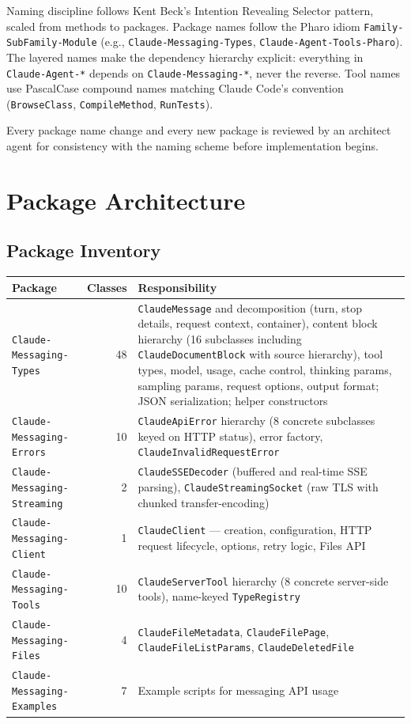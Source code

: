 \documentclass[a4paper,10pt,fleqn]{article}
\newcommand{\cls}[1]{\texttt{#1}}
\newcommand{\pkg}[1]{\texttt{#1}}
\begin{document}
Naming discipline follows Kent Beck's Intention Revealing Selector
pattern, scaled from methods to packages.  Package names follow the
Pharo idiom \texttt{Family-SubFamily-Module} (e.g.,
\texttt{Claude-Messaging-Types}, \texttt{Claude-Agent-Tools-Pharo}).
The layered names make the dependency hierarchy explicit: everything in
\texttt{Claude-Agent-*} depends on \texttt{Claude-Messaging-*}, never
the reverse.  Tool names use PascalCase compound names matching Claude
Code's convention (\texttt{BrowseClass}, \texttt{CompileMethod},
\texttt{RunTests}).

Every package name change and every new package is reviewed by an
architect agent for consistency with the naming scheme before
implementation begins.

\section{Package Architecture}
\label{notes:package-architecture}

\subsection{Package Inventory}

\begin{center}
\begin{tabularx}{\linewidth}{@{}lrY@{}}
\toprule
\textbf{Package} & \textbf{Classes} & \textbf{Responsibility} \\
\midrule
\pkg{Claude-Messaging-Types}      & 48 & \cls{ClaudeMessage} and decomposition
  (turn, stop details, request context, container), content block hierarchy
  (16 subclasses including \cls{ClaudeDocumentBlock} with source hierarchy),
  tool types, model, usage, cache control, thinking params, sampling params,
  request options, output format; JSON serialization; helper constructors \\
\pkg{Claude-Messaging-Errors}    & 10 & \cls{ClaudeApiError} hierarchy (8 concrete
  subclasses keyed on HTTP status), error factory, \cls{ClaudeInvalidRequestError} \\
\pkg{Claude-Messaging-Streaming} &  2 & \cls{ClaudeSSEDecoder} (buffered and real-time
  SSE parsing), \cls{ClaudeStreamingSocket} (raw TLS with chunked
  transfer-encoding) \\
\pkg{Claude-Messaging-Client}    &  1 & \cls{ClaudeClient} --- creation, configuration,
  HTTP request lifecycle, options, retry logic, Files API \\
\pkg{Claude-Messaging-Tools}     & 10 & \cls{ClaudeServerTool} hierarchy (8 concrete
  server-side tools), name-keyed \cls{TypeRegistry} \\
\pkg{Claude-Messaging-Files}     &  4 & \cls{ClaudeFileMetadata},
  \cls{ClaudeFilePage}, \cls{ClaudeFileListParams},
  \cls{ClaudeDeletedFile} \\
\pkg{Claude-Messaging-Examples}  &  7 & Example scripts for messaging API usage \\
\bottomrule
\end{tabularx}
\end{center}
\end{document}

